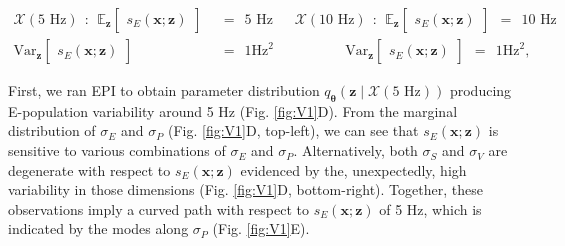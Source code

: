 \documentclass[11pt]{article}
\begin{document}
\begin{equation}\label{eq:EP_V1}
\begin{split}
\mathcal{X}(5\text{ Hz}) ~~:~~  \mathbb{E}_{\mathbf{z}}\begin{bmatrix} s_E(\mathbf{x}; \mathbf{z}) \end{bmatrix}  &~~=~~ 5\text{ Hz}~~~~~~~\mathcal{X}(10\text{ Hz}) ~~:~~  \mathbb{E}_{\mathbf{z}}\begin{bmatrix} s_E(\mathbf{x}; \mathbf{z}) \end{bmatrix}  ~~=~~ 10\text{ Hz}  \\ 
 \text{Var}_{\mathbf{z}}\begin{bmatrix} s_E(\mathbf{x}; \mathbf{z}) \end{bmatrix}  &~~=~~  1 \text{Hz}^2~~~~~~~~~~~~~~~~~~~~~~~ \text{Var}_{\mathbf{z}}\begin{bmatrix} s_E(\mathbf{x}; \mathbf{z}) \end{bmatrix}  ~~=~~  1 \text{Hz}^2,
\end{split}
\end{equation}

First, we ran EPI to obtain parameter distribution $q_{\bm{\theta}}(\mathbf{z} \mid \mathcal{X}(5\text{ Hz}))$ producing E-population variability around 5 Hz (Fig. \ref{fig:V1}D).
From the marginal distribution of $\sigma_E$ and $\sigma_P$ (Fig. \ref{fig:V1}D, top-left), we can see that $s_E(\mathbf{x}; \mathbf{z})$ is sensitive to various combinations of $\sigma_E$ and $\sigma_P$.
Alternatively, both $\sigma_S$ and $\sigma_V$ are degenerate with respect to $s_E(\mathbf{x}; \mathbf{z})$ evidenced by the, unexpectedly, high variability in those dimensions (Fig. \ref{fig:V1}D, bottom-right).
Together, these observations imply a curved path with respect to $s_E(\mathbf{x}; \mathbf{z})$ of 5 Hz, which is indicated by the modes along $\sigma_P$ (Fig. \ref{fig:V1}E).
\end{document}
